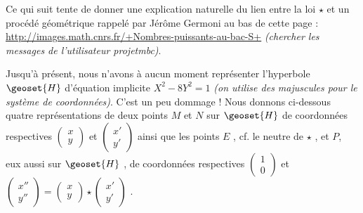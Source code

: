 Ce qui suit tente de donner une explication naturelle du lien entre la loi $\star$ et un procédé géométrique rappelé par Jérôme Germoni au bas de cette page :
\url{http://images.math.cnrs.fr/+Nombres-puissants-au-bac-S+}
\textit{(chercher les messages de l'utilisateur projetmbc)}.


\bigskip

Jusqu'à présent, nous n'avons à aucun moment représenter l'hyperbole $\geoset{H}$  d'équation implicite $X^2 - 8 Y^2 = 1$ \textit{(on utilise des majuscules pour le système de coordonnées)}. C'est un peu dommage ! Nous donnons ci-dessous quatre représentations de deux points $M$ et $N$ sur $\geoset{H}$ de coordonnées respectives 
$\begin{pmatrix}
  x \\ 
  y 
\end{pmatrix}$
et
$\begin{pmatrix} 
  x' \\ 
  y' 
\end{pmatrix}$
ainsi que les points $E$ , cf. le neutre de $\star$ , et $P$, eux aussi sur $\geoset{H}$ , de coordonnées respectives 
$\begin{pmatrix}
  1 \\ 
  0 
\end{pmatrix}$
et
$\begin{pmatrix} 
  x'' \\ 
  y''
\end{pmatrix}
=
\begin{pmatrix}
  x \\ 
  y 
\end{pmatrix}
\star
\begin{pmatrix} 
  x' \\ 
  y'
\end{pmatrix}$ .


\bigskip



